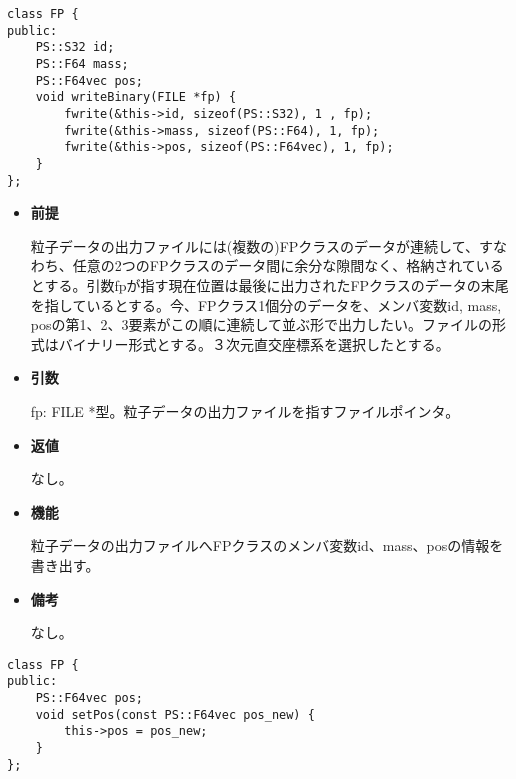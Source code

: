 
\begin{screen}
\begin{verbatim}
class FP {
public:
    PS::S32 id;
    PS::F64 mass;
    PS::F64vec pos;
    void writeBinary(FILE *fp) {
        fwrite(&this->id, sizeof(PS::S32), 1 , fp);
        fwrite(&this->mass, sizeof(PS::F64), 1, fp);
        fwrite(&this->pos, sizeof(PS::F64vec), 1, fp);
    }
};
\end{verbatim}
\end{screen}

\begin{itemize}

\item {\bf 前提}

  粒子データの出力ファイルには(複数の)FPクラスのデータが連続して、すなわち、任意の2つのFPクラスのデータ間に余分な隙間なく、格納されているとする。引数fpが指す現在位置は最後に出力されたFPクラスのデータの末尾を指しているとする。今、FPクラス1個分のデータを、メンバ変数id, mass, posの第1、2、3要素がこの順に連続して並ぶ形で出力したい。ファイルの形式はバイナリー形式とする。３次元直交座標系を選択したとする。


\item {\bf 引数}

  fp: FILE *型。粒子データの出力ファイルを指すファイルポインタ。
  
\item {\bf 返値}

  なし。
  
\item {\bf 機能}

  粒子データの出力ファイルへFPクラスのメンバ変数id、mass、posの情報を
  書き出す。
  
\item {\bf 備考}

  なし。
  
\end{itemize}





\begin{screen}
\begin{verbatim}
class FP {
public:
    PS::F64vec pos;
    void setPos(const PS::F64vec pos_new) {
        this->pos = pos_new;
    }
};
\end{verbatim}
\end{screen}

